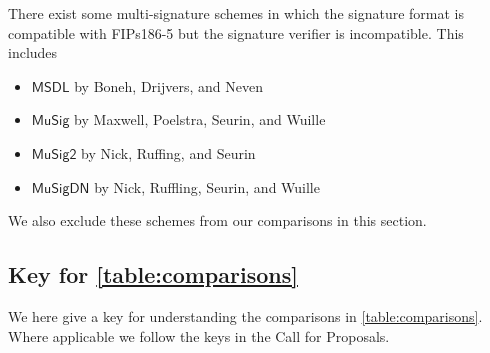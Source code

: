 There exist some multi-signature schemes in which the signature format is compatible with FIPs186-5 but the signature verifier is incompatible.
This includes
\begin{itemize}
	\item $\mathsf{MSDL}$ by Boneh, Drijvers, and Neven  \cite{BonehDN18}
	\item $\mathsf{MuSig}$ by Maxwell, Poelstra, Seurin, and Wuille \cite{MaxwellPSW19}
	\item $\mathsf{MuSig2}$ by Nick, Ruffing, and Seurin \cite{NickRS21}
	\item $\mathsf{MuSigDN}$ by Nick, Ruffling, Seurin, and Wuille \cite{NickRSW20}
\end{itemize}
We also exclude these schemes from our comparisons in this section.

\subsection{Key for \cref{table:comparisons}}\label{section:comparisons:tablekey}
We here give a key for understanding the comparisons in \cref{table:comparisons}.
Where applicable we follow the keys in the Call for Proposals.
